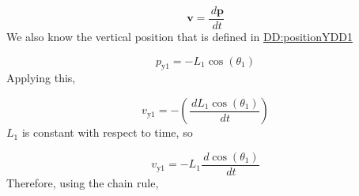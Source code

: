 \documentclass[12pt]{article}
\begin{document}
\begin{displaymath}
\symbf{v}=\frac{\,d\symbf{p}}{\,dt}
\end{displaymath}
We also know the vertical position that is defined in \hyperref[DD:positionYDD1]{DD:positionYDD1}

\begin{displaymath}
{p_{\text{y}1}}=-{L_{1}} \cos\left({θ_{1}}\right)
\end{displaymath}
Applying this,

\begin{displaymath}
{v_{\text{y}1}}=-\left(\frac{\,d{L_{1}} \cos\left({θ_{1}}\right)}{\,dt}\right)
\end{displaymath}
${L_{1}}$ is constant with respect to time, so

\begin{displaymath}
{v_{\text{y}1}}=-{L_{1}} \frac{\,d\cos\left({θ_{1}}\right)}{\,dt}
\end{displaymath}
Therefore, using the chain rule,
\end{document}
